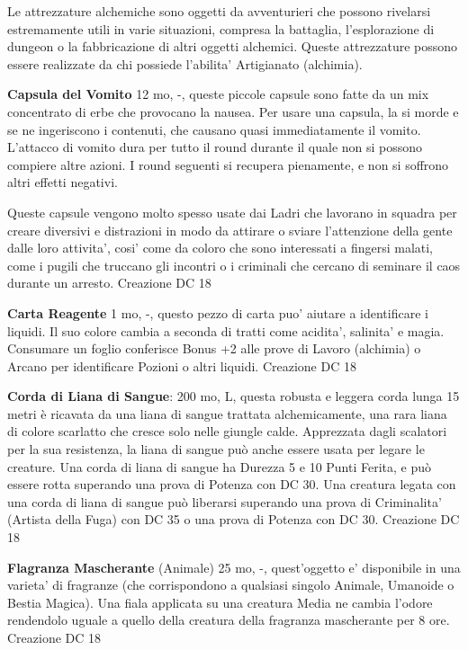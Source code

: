 \documentclass[a4paper,11pt,twoside,openany]{book}
\begin{document}
{\label{attrezzature-alchemiche}

Le attrezzature alchemiche sono oggetti da avventurieri che possono rivelarsi estremamente utili in varie situazioni, compresa la battaglia, l'esplorazione di dungeon o la fabbricazione di altri oggetti alchemici. Queste attrezzature possono essere realizzate da chi possiede l'abilita' Artigianato (alchimia).

\textbf{Capsula del Vomito} 12 mo, -, queste piccole capsule sono fatte da un mix concentrato di erbe che provocano la nausea. Per usare una capsula, la si morde e se ne ingeriscono i contenuti, che causano quasi immediatamente il vomito. L'attacco di vomito dura per tutto il round durante il quale non si possono compiere altre azioni. I round seguenti si recupera pienamente, e non si soffrono altri effetti negativi.

Queste capsule vengono molto spesso usate dai Ladri che lavorano in squadra per creare diversivi e distrazioni in modo da attirare o sviare l'attenzione della gente dalle loro attivita', cosi' come da coloro che sono interessati a fingersi malati, come i pugili che truccano gli incontri o i criminali che cercano di seminare il caos durante un arresto. Creazione DC 18

\textbf{Carta Reagente} 1 mo, -, questo pezzo di carta puo' aiutare a identificare i liquidi. Il suo colore cambia a seconda di tratti come acidita', salinita' e magia. Consumare un foglio conferisce Bonus +2 alle prove di Lavoro (alchimia) o Arcano per identificare Pozioni o altri liquidi. Creazione DC 18

\textbf{Corda di Liana di Sangue}: 200 mo, L, questa robusta e leggera corda lunga 15 metri è ricavata da una liana di sangue trattata alchemicamente, una rara liana di colore scarlatto che cresce solo nelle giungle calde.
Apprezzata dagli scalatori per la sua resistenza, la liana di sangue può anche essere usata per legare le creature. Una corda di liana di sangue ha Durezza 5 e 10 Punti Ferita, e può essere rotta superando una prova di Potenza con DC 30.
Una creatura legata con una corda di liana di sangue può liberarsi superando una prova di Criminalita’ (Artista della Fuga) con DC 35 o una prova di Potenza con DC 30. Creazione DC 18

\textbf{Flagranza Mascherante} (Animale) 25 mo, -, quest'oggetto e' disponibile in una varieta' di fragranze (che corrispondono a qualsiasi singolo Animale, Umanoide o Bestia Magica). Una fiala applicata su una creatura Media ne cambia l'odore rendendolo uguale a quello della creatura della fragranza mascherante per 8 ore. Creazione DC 18

}
\end{document}
